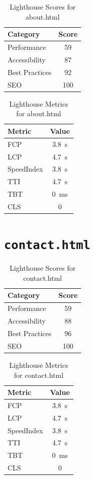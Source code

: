     \begin{table}[H]
    \centering
    \caption{Lighthouse Scores for about.html}
    \begin{tabular}{|l|c|}
    \hline
    Category & Score \\ \hline
    Performance & 59 \\ \hline
    Accessibility & 87 \\ \hline
    Best Practices & 92 \\ \hline
    SEO & 100 \\ \hline
    \end{tabular}
    \end{table}

    \begin{table}[H]
    \centering
    \caption{Lighthouse Metrics for about.html}
    \begin{tabular}{|l|c|}
    \hline
    Metric & Value \\ \hline
    FCP & 3.8 s \\ \hline
    LCP & 4.7 s \\ \hline
    SpeedIndex & 3.8 s \\ \hline
    TTI & 4.7 s \\ \hline
    TBT & 0 ms \\ \hline
    CLS & 0 \\ \hline
    \end{tabular}
    \end{table}
    \section{\texttt{contact.html}}

    \begin{table}[H]
    \centering
    \caption{Lighthouse Scores for contact.html}
    \begin{tabular}{|l|c|}
    \hline
    Category & Score \\ \hline
    Performance & 59 \\ \hline
    Accessibility & 88 \\ \hline
    Best Practices & 96 \\ \hline
    SEO & 100 \\ \hline
    \end{tabular}
    \end{table}

    \begin{table}[H]
    \centering
    \caption{Lighthouse Metrics for contact.html}
    \begin{tabular}{|l|c|}
    \hline
    Metric & Value \\ \hline
    FCP & 3.8 s \\ \hline
    LCP & 4.7 s \\ \hline
    SpeedIndex & 3.8 s \\ \hline
    TTI & 4.7 s \\ \hline
    TBT & 0 ms \\ \hline
    CLS & 0 \\ \hline
    \end{tabular}
    \end{table}
